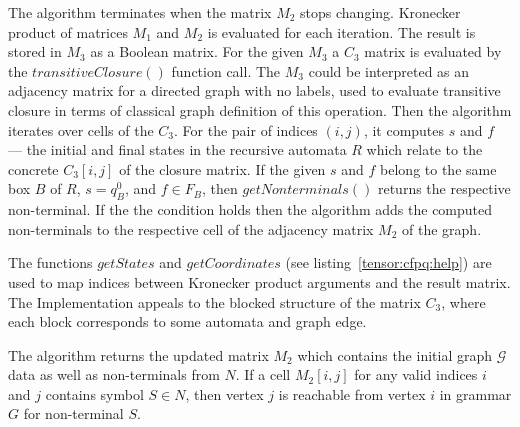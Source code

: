 The algorithm terminates when the matrix $M_2$ stops changing.
Kronecker product of matrices $M_1$ and $M_2$ is evaluated for each iteration.
The result is stored in $M_3$ as a Boolean matrix.
For the given $M_3$ a $C_3$ matrix is evaluated by the $transitiveClosure()$ function call.
The $M_3$ could be interpreted as an adjacency matrix for a directed graph with no labels, used to evaluate transitive closure in terms of classical graph definition of this operation.
Then the algorithm iterates over cells of the $C_3$.
For the pair of indices $(i,j)$, it computes $s$ and $f$ --- the initial and final states in the recursive automata $R$ which relate to the concrete $C_3[i,j]$ of the closure matrix.
If the given $s$ and $f$ belong to the same box $B$ of $R$, $s = q_B^0$, and $f \in F_B$, then $getNonterminals()$ returns the respective non-terminal.
If the the condition holds then the algorithm  adds the computed non-terminals to the respective cell of the adjacency matrix $M_2$ of the graph.

The functions $getStates$ and $getCoordinates$ (see listing~\ref{tensor:cfpq:help}) are used to map indices between Kronecker product arguments and the result matrix.
The Implementation appeals to the blocked structure of the matrix $C_3$, where each block corresponds to some automata and graph edge.

The algorithm returns the updated matrix $M_2$ which contains the initial graph $\mathcal{G}$ data as well as non-terminals from $N$.
If a cell $M_2[i,j]$ for any valid indices $i$ and $j$ contains symbol $S \in N$, then vertex $j$ is reachable from vertex $i$ in grammar $G$ for non-terminal $S$.


